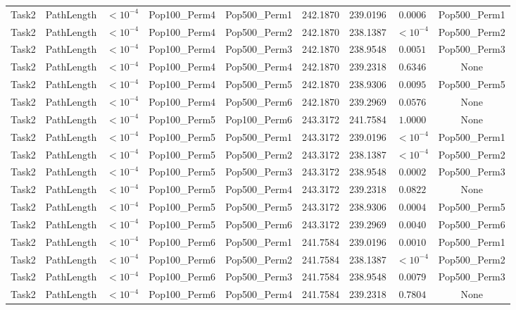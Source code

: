 \documentclass[8pt]{article}
\begin{document}
\begin{longtable}{llccccccc}
Task2 & PathLength & $< 10^{-4}$ & Pop100\_Perm4 & Pop500\_Perm1 & 242.1870 & 239.0196 & $0.0006$ & Pop500\_Perm1 \\
Task2 & PathLength & $< 10^{-4}$ & Pop100\_Perm4 & Pop500\_Perm2 & 242.1870 & 238.1387 & $< 10^{-4}$ & Pop500\_Perm2 \\
Task2 & PathLength & $< 10^{-4}$ & Pop100\_Perm4 & Pop500\_Perm3 & 242.1870 & 238.9548 & $0.0051$ & Pop500\_Perm3 \\
Task2 & PathLength & $< 10^{-4}$ & Pop100\_Perm4 & Pop500\_Perm4 & 242.1870 & 239.2318 & $0.6346$ & None \\
Task2 & PathLength & $< 10^{-4}$ & Pop100\_Perm4 & Pop500\_Perm5 & 242.1870 & 238.9306 & $0.0095$ & Pop500\_Perm5 \\
Task2 & PathLength & $< 10^{-4}$ & Pop100\_Perm4 & Pop500\_Perm6 & 242.1870 & 239.2969 & $0.0576$ & None \\
Task2 & PathLength & $< 10^{-4}$ & Pop100\_Perm5 & Pop100\_Perm6 & 243.3172 & 241.7584 & $1.0000$ & None \\
Task2 & PathLength & $< 10^{-4}$ & Pop100\_Perm5 & Pop500\_Perm1 & 243.3172 & 239.0196 & $< 10^{-4}$ & Pop500\_Perm1 \\
Task2 & PathLength & $< 10^{-4}$ & Pop100\_Perm5 & Pop500\_Perm2 & 243.3172 & 238.1387 & $< 10^{-4}$ & Pop500\_Perm2 \\
Task2 & PathLength & $< 10^{-4}$ & Pop100\_Perm5 & Pop500\_Perm3 & 243.3172 & 238.9548 & $0.0002$ & Pop500\_Perm3 \\
Task2 & PathLength & $< 10^{-4}$ & Pop100\_Perm5 & Pop500\_Perm4 & 243.3172 & 239.2318 & $0.0822$ & None \\
Task2 & PathLength & $< 10^{-4}$ & Pop100\_Perm5 & Pop500\_Perm5 & 243.3172 & 238.9306 & $0.0004$ & Pop500\_Perm5 \\
Task2 & PathLength & $< 10^{-4}$ & Pop100\_Perm5 & Pop500\_Perm6 & 243.3172 & 239.2969 & $0.0040$ & Pop500\_Perm6 \\
Task2 & PathLength & $< 10^{-4}$ & Pop100\_Perm6 & Pop500\_Perm1 & 241.7584 & 239.0196 & $0.0010$ & Pop500\_Perm1 \\
Task2 & PathLength & $< 10^{-4}$ & Pop100\_Perm6 & Pop500\_Perm2 & 241.7584 & 238.1387 & $< 10^{-4}$ & Pop500\_Perm2 \\
Task2 & PathLength & $< 10^{-4}$ & Pop100\_Perm6 & Pop500\_Perm3 & 241.7584 & 238.9548 & $0.0079$ & Pop500\_Perm3 \\
Task2 & PathLength & $< 10^{-4}$ & Pop100\_Perm6 & Pop500\_Perm4 & 241.7584 & 239.2318 & $0.7804$ & None \\

\end{longtable}
\end{document}
